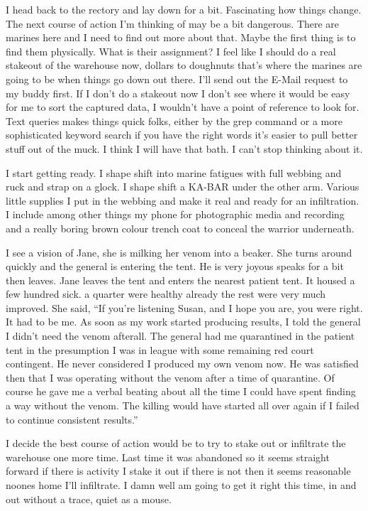 I head back to the rectory and lay down for a bit. Fascinating how things change. The next course of action I'm thinking of may be a bit dangerous. There are marines here and I need to find out more about that. 
Maybe the first thing is to find them physically. What is their assignment? I feel like I should do a real stakeout of the warehouse now, dollars to doughnuts that's where the marines are going to be when things go down out there. I'll send out the E-Mail request to my buddy first. If I don't do a stakeout now I don't see where it would be easy for me to sort the captured data, I wouldn't have a point of reference to look for. Text queries makes things quick folks, either by the grep command or a more sophisticated keyword search if you have the right words it's easier to pull better stuff out of the muck. I think I will have that bath. I can't stop thinking about it.

I start getting ready. I shape shift into marine fatigues with full webbing and ruck and strap on a glock. I shape shift a KA-BAR under the other arm. Various little supplies I put in the webbing and make it real and ready for an infiltration. I include among other things my phone for photographic media and recording and a really boring brown colour trench coat to conceal the warrior underneath.

I see a vision of Jane, she is milking her venom into a beaker. She turns around quickly and the general is entering the tent. He is very joyous speaks for a bit then leaves. Jane leaves the tent and enters the nearest patient tent. It housed a few hundred sick. a quarter were healthy already the rest were very much improved. She said, ``If you're listening Susan, and I hope you are, you were right. It had to be me. As soon as my work started producing results, I told the general I didn't need the venom afterall. The general had me quarantined in the patient tent in the presumption I was in league with some remaining red court contingent. He never considered I produced my own venom now. He was satisfied then that I was operating without the venom after a time of quarantine. Of course he gave me a verbal beating about all the time I could have spent finding a way without the venom. The killing would have started all over again if I failed to continue consistent results.''

I decide the best course of action would be to try to stake out or infiltrate the warehouse one more time. Last time it was abandoned so it seems straight forward if there is activity I stake it out if there is not then it seems reasonable noones home I'll infiltrate. I damn well am going to get it right this time, in and out without a trace, quiet as a mouse.

